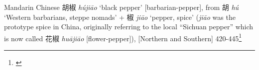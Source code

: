 \begin{etymology}\label{ety:hujiao}
Mandarin Chinese {胡椒} \textit{hú​jiāo} `black pepper' [barbarian-pepper], from 胡 \textit{hú​} `Western barbarians, steppe nomads' + 椒 \textit{jiāo} `pepper, spice' (\textit{jiāo} was the prototype spice in China, originally referring to the local ``Sichuan pepper'' which is now called 花椒 \textit{huājiāo} [flower-pepper]), [Northern and Southern] 420-445\footnote{\textcite{schuessler_abc_2007}}
\end{etymology}